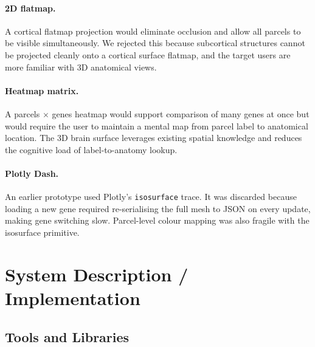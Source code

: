 \documentclass[11pt,letterpaper]{article}
\begin{document}
\paragraph{2D flatmap.}
A cortical flatmap projection would eliminate occlusion and allow all parcels
to be visible simultaneously.
We rejected this because subcortical structures cannot be projected cleanly
onto a cortical surface flatmap, and the target users are more familiar with
3D anatomical views.

\paragraph{Heatmap matrix.}
A parcels $\times$ genes heatmap would support comparison of many genes at
once but would require the user to maintain a mental map from parcel label
to anatomical location.
The 3D brain surface leverages existing spatial knowledge and reduces the
cognitive load of label-to-anatomy lookup.

\paragraph{Plotly Dash.}
An earlier prototype used Plotly's \texttt{isosurface} trace.
It was discarded because loading a new gene required re-serialising the full
mesh to JSON on every update, making gene switching slow. Parcel-level colour
mapping was also fragile with the isosurface primitive.

\section{System Description / Implementation}
\label{sec:system}

\subsection{Tools and Libraries}
\end{document}
